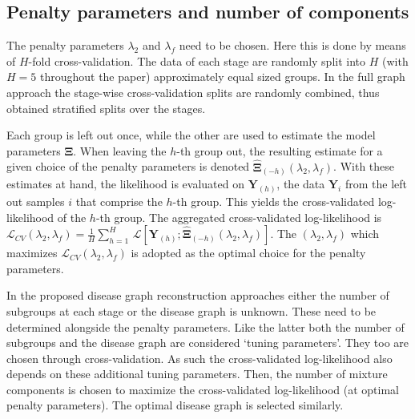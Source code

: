 \documentclass[10pt]{article}
\begin{document}
\subsection{Penalty parameters and number of components}\label{cv}
The penalty parameters $\lambda_2$ and $\lambda_f$ need to be chosen. Here this is done by means of $H$-fold cross-validation. The data of each stage are randomly split into $H$ (with $H=5$ throughout the paper) approximately equal sized groups. In the full graph approach the stage-wise cross-validation splits are randomly combined, thus obtained stratified splits over the stages. 

Each group is left out once, while the other are used to estimate the model parameters $\mathbf{\Xi}$. When leaving the $h$-th group out, the resulting estimate for a given choice of the penalty parameters is denoted $\widehat{\mathbf{\Xi}}_{(-h)}(\lambda_2, \lambda_f)$. With these estimates at hand, the likelihood is evaluated on $\mathbf{Y}_{(h)}$, the data $\mathbf{Y}_i$ from the left out samples $i$ that comprise the $h$-th group. This yields the cross-validated log-likelihood of the $h$-th group. The aggregated cross-validated log-likelihood is $\mathcal{L}_{CV}(\lambda_2, \lambda_f) = \tfrac{1}{H}\sum_{h=1}^H \, \mathcal{L}[\mathbf{Y}_{(h)}; \widehat{\mathbf{\Xi}}_{(-h)}(\lambda_2, \lambda_f)]$. The $(\lambda_2, \lambda_f)$ which maximizes $\mathcal{L}_{CV}(\lambda_2, \lambda_f)$ is adopted as the optimal choice for the penalty parameters.

In the proposed disease graph reconstruction approaches either the number of subgroups at each stage or the disease graph is unknown. These need to be determined alongside the penalty parameters. Like the latter both the number of subgroups and the disease graph are considered `tuning parameters'. They too are chosen through cross-validation. As such the cross-validated log-likelihood also depends on these additional tuning parameters. Then, the number of mixture components is chosen to maximize the cross-validated log-likelihood (at optimal penalty parameters). The optimal disease graph is selected similarly.
\end{document}
